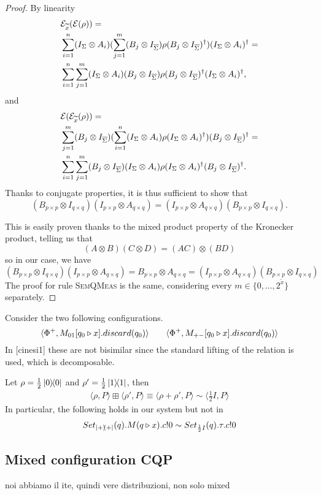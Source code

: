 \begin{proof}
	By linearity 
	\begin{align*}
	&\mathcal{E}_{\widetilde{x}}(\mathcal{E}(\rho)) =\\ 
	&\sum_{i = 1}^{n} (I_{\Sigma} \otimes A_i) (\sum_{j = 1}^{m} (B_j \otimes I_{\overline{\Sigma}}) \rho (B_j \otimes I_{\overline{\Sigma}})^{\dagger}) (I_{\Sigma} \otimes A_i)^{\dagger} =\\
	&\sum_{i = 1}^{n} \sum_{j = 1}^{m} (I_{\Sigma} \otimes A_i) (B_j \otimes I_{\overline{\Sigma}}) \rho (B_j \otimes I_{\overline{\Sigma}})^{\dagger} (I_{\Sigma} \otimes A_i)^{\dagger},
	\end{align*}
	and
	\begin{align*}
	&\mathcal{E}(\mathcal{E}_{\widetilde{x}}(\rho)) =\\
	&\sum_{j = 1}^{m} (B_j \otimes I_{\overline{\Sigma}}) (\sum_{i = 1}^{n} (I_{\Sigma} \otimes A_i) \rho (I_{\Sigma} \otimes A_i)^{\dagger}) (B_j \otimes I_{\overline{\Sigma}})^{\dagger} =\\
	&\sum_{i = 1}^{n} \sum_{j = 1}^{m} (B_j \otimes I_{\overline{\Sigma}}) (I_{\Sigma} \otimes A_i) \rho (I_{\Sigma} \otimes A_i)^{\dagger} (B_j \otimes I_{\overline{\Sigma}})^{\dagger}.
	\end{align*}
	Thanks to conjugate properties, it is thus sufficient to show that
	\[
	(B_{p\times p} \otimes I_{q\times q}) (I_{p\times p} \otimes A_{q\times q}) = (I_{p\times p} \otimes A_{q\times q}) (B_{p\times p} \otimes I_{q\times q}).
	\]
	
	This is easily proven thanks to the mixed product property of the Kronecker product, telling us that 
	\[ (A \otimes B)(C \otimes D) = (AC)\otimes(BD)
	\]
	so in our case, we have 
	\[
	(B_{p\times p} \otimes I_{q\times q}) (I_{p\times p} \otimes A_{q\times q}) = B_{p\times p} \otimes A_{q \times q} = (I_{p\times p} \otimes A_{q\times q}) (B_{p\times p} \otimes I_{q\times q})
	\]	
The proof for rule {\scshape SemQMeas} is the same, considering every $m \in \{0, \dots, 2^{\widetilde{x}}\}$ separately.
\end{proof}


\begin{example}
	Consider the two following configurations.
	\[
		\langle\Phi^+, M_{01}[q_0 \triangleright x].discard(q_0)\rangle\qquad \langle\Phi^+, M_{+-}[q_0 \triangleright x].discard(q_0)\rangle	
	\]
	In [cinesi1] these are not bisimilar since the standard lifting of the relation is used, which is decomposable.
\end{example}


\begin{example}
Let $\rho = \frac{1}{2} \ket{0}\!\!\bra{0}$ and $\rho' = \frac{1}{2} \ket{1}\!\!\bra{1}$, then
\begin{align*}
	\langle \rho, P \rangle \boxplus \langle \rho', P \rangle \equiv \langle \rho + \rho', P \rangle \sim \langle \frac{1}{2} I, P \rangle
\end{align*}
In particular, the following holds in our system but not in~\cite{Feng:2012, Deng:2012}
\begin{align*}
	Set_{\ket{+}\!\!\bra{+}}(q).M(q \triangleright x).c!0 \sim Set_{\frac{1}{2} I}(q).\tau.c!0
\end{align*}
\end{example}

\subsection{Mixed configuration CQP}
noi abbiamo il ite, quindi vere distribuzioni, non solo mixed

